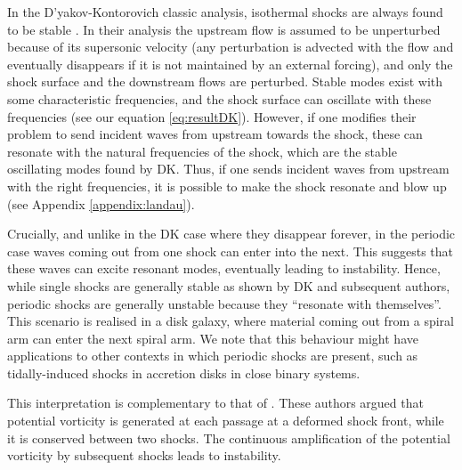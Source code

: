 \documentclass[useAMS,usenatbib]{mn2e}
\begin{document}
In the D'yakov-Kontorovich classic analysis, isothermal shocks are always found to be stable \citep[see Appendix \ref{appendix:landau} and  in][]{landau}. In their analysis the upstream flow is assumed to be unperturbed because of its supersonic velocity (any perturbation is advected with the flow and eventually disappears if it is not maintained by an external forcing), and only the shock surface and the downstream flows are perturbed. Stable modes exist with some characteristic frequencies, and the shock surface can oscillate with these frequencies (see our equation \ref{eq:resultDK}). However, if one modifies their problem to send incident waves from upstream towards the shock, these can resonate with the natural frequencies of the shock, which are the stable oscillating modes found by DK. Thus, if one sends incident waves from upstream with the right frequencies, it is possible to make the shock resonate and blow up (see Appendix \ref{appendix:landau}).

Crucially, and unlike in the DK case where they disappear forever, in the periodic case waves coming out from one shock can enter into the next. This suggests that these waves can excite resonant modes, eventually leading to instability. Hence, while single shocks are generally stable as shown by DK and subsequent authors, periodic shocks are generally unstable because they ``resonate with themselves''. This scenario is realised in a disk galaxy, where material coming out from a spiral arm can enter the next spiral arm. We note that this behaviour might have applications to other contexts in which periodic shocks are present, such as tidally-induced shocks in accretion disks in close binary systems.

This interpretation is complementary to that of \cite{KimKimKim2014}. These authors argued that potential vorticity is generated at each passage at a deformed shock front, while it is conserved between two shocks. The continuous amplification of the potential vorticity by subsequent shocks leads to instability. 
\end{document}
